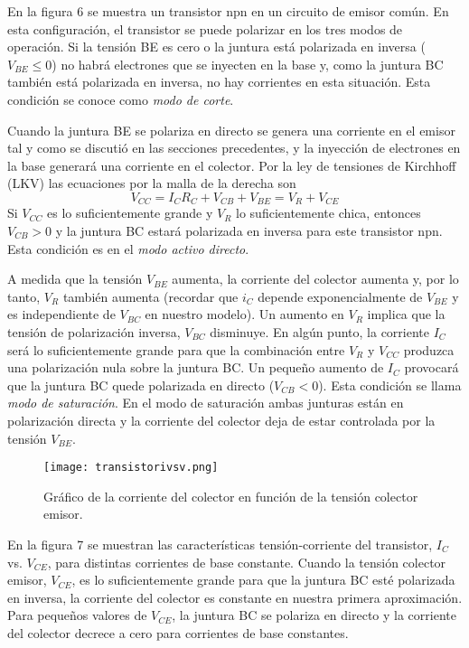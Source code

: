 \documentclass[12pt,a4paper]{article}
\begin{document}
En la figura 6 se muestra un transistor npn en un circuito de emisor común. En esta configuración, el transistor se puede polarizar en los tres modos de operación. Si la tensión BE es cero o la juntura está polarizada en inversa ($V_{BE} \leq 0$) no habrá electrones que se inyecten en la base y, como la juntura BC también está polarizada en inversa, no hay corrientes en esta situación. Esta condición se conoce como \emph{modo de corte}.

Cuando la juntura BE se polariza en directo se genera una corriente en el emisor tal y como se discutió en las secciones precedentes, y la inyección de electrones en la base generará una corriente en el colector. Por la ley de tensiones de Kirchhoff (LKV) las ecuaciones por la malla de la derecha son
\[ V_{CC}=I_{C}R_{C}+V_{CB}+V_{BE}=V_{R}+V_{CE} \]
Si $V_{CC}$ es lo suficientemente grande y $V_{R}$ lo suficientemente chica, entonces $V_{CB}>0$ y la juntura BC estará polarizada en inversa para este transistor npn. Esta condición es en el \emph{modo activo directo}.

A medida que la tensión $V_{BE}$ aumenta, la corriente del colector aumenta y, por lo tanto, $V_{R}$ también aumenta (recordar que $i_{C}$ depende exponencialmente de $V_{BE}$ y es independiente de $V_{BC}$ en nuestro modelo). Un aumento en $V_{R}$ implica que la tensión de polarización inversa, $V_{BC}$ disminuye. En algún punto, la corriente $I_{C}$ será lo suficientemente grande para que la combinación entre $V_{R}$ y $V_{CC}$ produzca una polarización nula sobre la juntura BC. Un pequeño aumento de $I_{C}$ provocará que la juntura BC quede polarizada en directo ($V_{CB}<0$). Esta condición se llama \emph{modo de saturación}. En el modo de saturación ambas junturas están en polarización directa y la corriente del colector deja de estar controlada por la tensión $V_{BE}$.

\begin{figure}[ht!]
\begin{center}
\texttt{[image: transistorivsv.png]}
\caption{Gráfico de la corriente del colector en función de la tensión colector emisor.}
\end{center}
\end{figure}

En la figura 7 se muestran las características tensión-corriente del transistor, $I_{C}$ vs. $V_{CE}$, para distintas corrientes de base constante. Cuando la tensión colector emisor, $V_{CE}$, es lo suficientemente grande para que la juntura BC esté polarizada en inversa, la corriente del colector es constante en nuestra primera aproximación. Para pequeños valores de $V_{CE}$, la juntura BC se polariza en directo y la corriente del colector decrece a cero para corrientes de base constantes.
\end{document}
